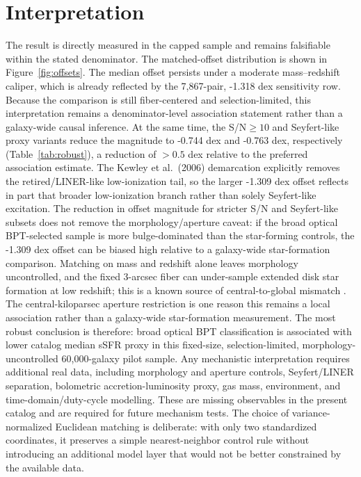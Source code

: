 \documentclass[twocolumn]{aastex631}
\begin{document}
\section{Interpretation}
The result is directly measured in the capped sample and remains falsifiable within the stated denominator. The matched-offset distribution is shown in Figure~\ref{fig:offsets}. The median offset persists under a moderate mass--redshift caliper, which is already reflected by the 7,867-pair, -1.318 dex sensitivity row. Because the comparison is still fiber-centered and selection-limited, this interpretation remains a denominator-level association statement rather than a galaxy-wide causal inference. At the same time, the S/N$\geq10$ and Seyfert-like proxy variants reduce the magnitude to -0.744 dex and -0.763 dex, respectively (Table~\ref{tab:robust}), a reduction of $>0.5$ dex relative to the preferred association estimate. The Kewley et al.\ (2006) demarcation explicitly removes the retired/LINER-like low-ionization tail, so the larger -1.309 dex offset reflects in part that broader low-ionization branch rather than solely Seyfert-like excitation. The reduction in offset magnitude for stricter S/N and Seyfert-like subsets does not remove the morphology/aperture caveat: if the broad optical BPT-selected sample is more bulge-dominated than the star-forming controls, the -1.309 dex offset can be biased high relative to a galaxy-wide star-formation comparison. Matching on mass and redshift alone leaves morphology uncontrolled, and the fixed 3-arcsec fiber can under-sample extended disk star formation at low redshift; this is a known source of central-to-global mismatch \citep[e.g.,][]{harrison2017,ellison2021}. The central-kiloparsec aperture restriction is one reason this remains a local association rather than a galaxy-wide star-formation measurement. The most robust conclusion is therefore: broad optical BPT classification is associated with lower catalog median sSFR proxy in this fixed-size, selection-limited, morphology-uncontrolled 60,000-galaxy pilot sample. Any mechanistic interpretation requires additional real data, including morphology and aperture controls, Seyfert/LINER separation, bolometric accretion-luminosity proxy, gas mass, environment, and time-domain/duty-cycle modelling. These are missing observables in the present catalog and are required for future mechanism tests.
The choice of variance-normalized Euclidean matching is deliberate: with only two standardized coordinates, it preserves a simple nearest-neighbor control rule without introducing an additional model layer that would not be better constrained by the available data.
\end{document}
